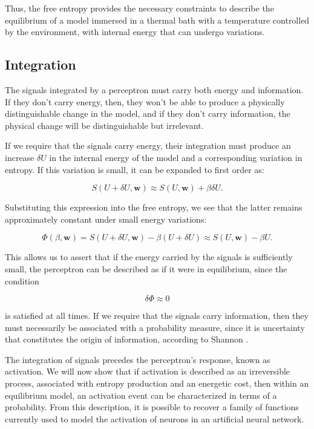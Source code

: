 \documentclass[12pt]{article}
\begin{document}
Thus, the free entropy provides the necessary constraints to describe the equilibrium of a model immersed in a thermal bath with a temperature controlled by the environment, with internal energy that can undergo variations.
\subsection*{Integration}

The signals integrated by a perceptron must carry both energy and information. If they don't carry energy, then, they won't be able to produce a physically distinguishable change in the model, and if they don't carry information, the physical change will be distinguishable but irrelevant.

If we require that the signals carry energy, their integration must produce an increase $\delta U$ in the internal energy of the model and a corresponding variation in entropy. If this variation is small, it can be expanded to first order as:

\begin{equation}
S(U+\delta U, \mathbf{w}) \approx S(U, \mathbf{w}) + \beta \delta U.
\end{equation}

Substituting this expression into the free entropy, we see that the latter remains approximately constant under small energy variations:

\begin{equation}
\Phi(\beta, \mathbf{w}) = S(U + \delta U,\mathbf{w}) - \beta (U + \delta U) \approx S(U, \mathbf{w}) - \beta U.
\end{equation}

This allows us to assert that if the energy carried by the signals is sufficiently small, the perceptron can be described as if it were in equilibrium, since the condition

\begin{equation}
\delta \Phi \approx 0
\end{equation}

is satisfied at all times. If we require that the signals carry information, then they must necessarily be associated with a probability measure, since it is uncertainty that constitutes the origin of information, according to Shannon \cite{shannon1948mathematical}.

The integration of signals precedes the perceptron’s response, known as activation. We will now show that if activation is described as an irreversible process, associated with entropy production and an energetic cost, then within an equilibrium model, an activation event can be characterized in terms of a probability. From this description, it is possible to recover a family of functions currently used to model the activation of neurons in an artificial neural network.
\end{document}
